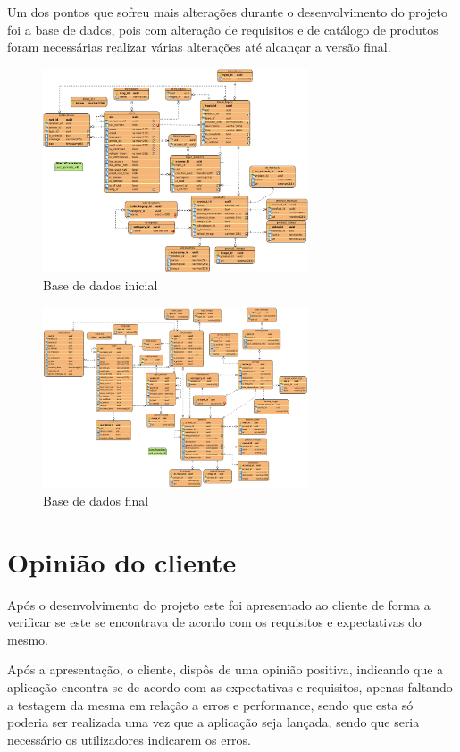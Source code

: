Um dos pontos que sofreu mais alterações durante o desenvolvimento do projeto foi a base de dados, pois com alteração de requisitos e de catálogo de produtos foram necessárias realizar várias alterações até alcançar a versão final.

\begin{figure}[htb]
  \centering
  \includegraphics[width=0.7\textwidth]{images/diagramas/diagrama_bd.png}
  \caption{Base de dados inicial}
  \label{fig:78}
\end{figure}

\begin{figure}[htb]
  \centering
  \includegraphics[width=0.7\textwidth]{images/diagramas/bd_final.png}
  \caption{Base de dados final}
  \label{fig:79}
\end{figure}

\section{Opinião do cliente}

Após o desenvolvimento do projeto este foi apresentado ao cliente de forma a verificar se este se encontrava de acordo com os requisitos e expectativas do mesmo.

Após a apresentação, o cliente, dispôs de uma opinião positiva, indicando que a aplicação encontra-se de acordo com as expectativas e requisitos, apenas faltando a testagem da mesma em relação a erros e performance, sendo que esta só poderia ser realizada uma vez que a aplicação seja lançada, sendo que seria necessário os utilizadores indicarem os erros.